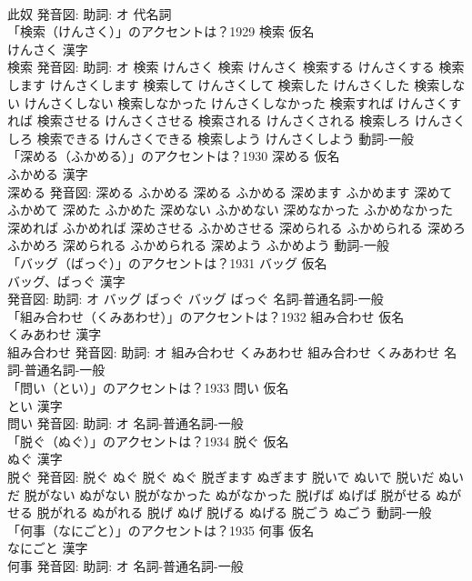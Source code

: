 \documentclass[8pt]{extreport}
\begin{document}
\begin{CJK}{UTF8}{min}
\\	此奴 発音図: 助詞: オ							代名詞 
\\	「検索（けんさく）」のアクセントは？1929	検索 仮名　
\\	けんさく 漢字　
\\	検索 発音図: 助詞: オ	検索 けんさく		検索 けんさく 検索する けんさくする 検索します けんさくします 検索して けんさくして 検索した けんさくした 検索しない けんさくしない 検索しなかった けんさくしなかった 検索すれば けんさくすれば 検索させる けんさくさせる 検索される けんさくされる 検索しろ けんさくしろ 検索できる けんさくできる 検索しよう けんさくしよう				動詞-一般 
\\	「深める（ふかめる）」のアクセントは？1930	深める 仮名　
\\	ふかめる 漢字　
\\	深める 発音図:	深める ふかめる		深める ふかめる 深めます ふかめます 深めて ふかめて 深めた ふかめた 深めない ふかめない 深めなかった ふかめなかった 深めれば ふかめれば 深めさせる ふかめさせる 深められる ふかめられる 深めろ ふかめろ 深められる ふかめられる 深めよう ふかめよう				動詞-一般 
\\	「バッグ（ばっぐ）」のアクセントは？1931	バッグ 仮名　
\\	バッグ、ばっぐ 漢字　
\\	発音図: 助詞: オ	バッグ ばっぐ		バッグ ばっぐ				名詞-普通名詞-一般 
\\	「組み合わせ（くみあわせ）」のアクセントは？1932	組み合わせ 仮名　
\\	くみあわせ 漢字　
\\	組み合わせ 発音図: 助詞: オ	組み合わせ くみあわせ		組み合わせ くみあわせ				名詞-普通名詞-一般 
\\	「問い（とい）」のアクセントは？1933	問い 仮名　
\\	とい 漢字　
\\	問い 発音図: 助詞: オ							名詞-普通名詞-一般 
\\	「脱ぐ（ぬぐ）」のアクセントは？1934	脱ぐ 仮名　
\\	ぬぐ 漢字　
\\	脱ぐ 発音図:	脱ぐ ぬぐ		脱ぐ ぬぐ 脱ぎます ぬぎます 脱いで ぬいで 脱いだ ぬいだ 脱がない ぬがない 脱がなかった ぬがなかった 脱げば ぬげば 脱がせる ぬがせる 脱がれる ぬがれる 脱げ ぬげ 脱げる ぬげる 脱ごう ぬごう				動詞-一般 
\\	「何事（なにごと）」のアクセントは？1935	何事 仮名　
\\	なにごと 漢字　
\\	何事 発音図: 助詞: オ							名詞-普通名詞-一般 

\end{CJK}
\end{document}
